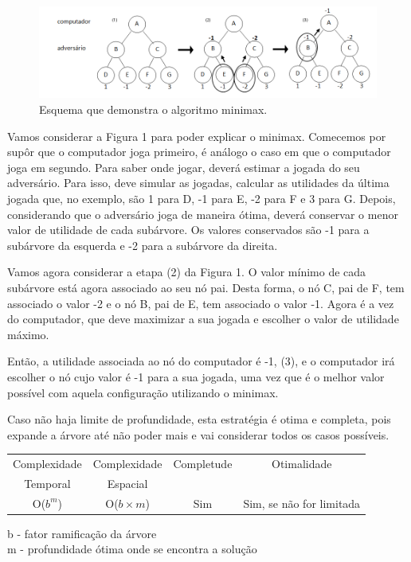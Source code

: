 \documentclass{article}
\begin{document}
\begin{figure}[H]
\begin{center}
\includegraphics[scale=0.55]{figure1.png}
\caption{Esquema que demonstra o algoritmo minimax.}
\end{center}
\end{figure}

 Vamos considerar a Figura 1 para poder explicar o minimax. Comecemos por supôr que o computador joga primeiro, é análogo o caso em que o computador joga em segundo. Para saber onde jogar, deverá estimar a jogada do seu adversário. Para isso, deve simular as jogadas, calcular as utilidades da última jogada que, no exemplo, são 1 para D, -1 para E, -2 para F e 3 para G. Depois, considerando que o adversário joga de maneira ótima, deverá conservar o menor valor de utilidade de cada subárvore. Os valores conservados são -1 para a subárvore da esquerda e -2 para a subárvore da direita.


Vamos agora considerar a etapa (2) da Figura 1. O valor mínimo de cada subárvore está agora associado ao seu nó pai. Desta forma, o nó C, pai de F, tem associado o valor -2 e o nó B, pai de E, tem associado o valor -1. Agora é a vez do computador, que deve maximizar a sua jogada e escolher o valor de utilidade máximo.


Então, a utilidade associada ao nó do computador é -1, (3), e o computador irá escolher o nó cujo valor é -1 para a sua jogada, uma vez que é o melhor valor possível com aquela configuração utilizando o minimax.

Caso não haja limite de profundidade, esta estratégia é otima e completa, pois expande a árvore até não poder mais e vai considerar todos os casos possíveis.

\begin{center}
\begin{tabular}{|c|c|c|c|}
  \hline
  Complexidade & Complexidade & Completude & Otimalidade\\
  Temporal & Espacial & & \\
  \hline
  O($b^m$) & O($b\times m$) & Sim & Sim, se não for limitada  \\
  \hline
\end{tabular}
\end{center}
b - fator ramificação da árvore\\
m - profundidade ótima onde se encontra a solução
\end{document}
